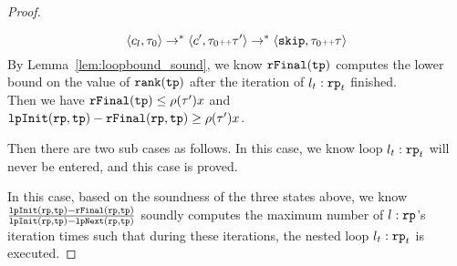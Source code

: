 \begin{proof}
\begin{itemize}
  \[
    \langle c_l, \mathtt{\tau}_0 \rangle \to^* \langle c', \mathtt{\tau}_0 {\scriptscriptstyle ++} \mathtt{\tau}' \rangle \to^* \langle \mathtt{skip}, \mathtt{\tau}_0 {\scriptscriptstyle ++} \mathtt{\tau} \rangle
  \]
  By Lemma~\ref{lem:loopbound_sound}, we know $\mathtt{rFinal}(\mathtt{tp})$ computes the lower bound on the value of $\mathtt{rank}(\mathtt{tp})$ after the iteration of $l_t:\mathtt{rp}_t$ finished.
  \\
  Then we have 
  $\mathtt{rFinal}(\mathtt{tp}) \leq \rho(\mathtt{\tau}') x$ and $\mathtt{lpInit}(\mathtt{rp}, \mathtt{tp}) - \mathtt{rFinal}(\mathtt{rp}, \mathtt{tp}) \geq \rho(\mathtt{\tau}') x$.
\end{itemize}
Then there are two sub cases as follows.
In this case, we know loop $l_t: \mathtt{rp}_t$ will never be entered, and this case is proved.

In this case, based on the soundness of the three states above, we know 
$\frac{\mathtt{lpInit}(\mathtt{rp}, \mathtt{tp}) - \mathtt{rFinal}(\mathtt{rp}, \mathtt{tp})}{\mathtt{lpInit}(\mathtt{rp}, \mathtt{tp}) - \mathtt{lpNext}(\mathtt{rp}, \mathtt{tp})}$ 
soundly computes the maximum number of $l: \mathtt{rp}$'s iteration times such that during these iterations, the nested loop $l_t: \mathtt{rp}_t$ is executed.
\end{proof}